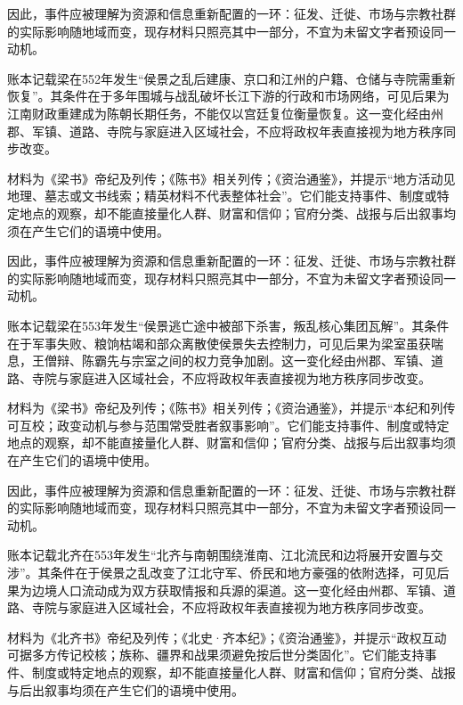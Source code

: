 因此，事件应被理解为资源和信息重新配置的一环：征发、迁徙、市场与宗教社群的实际影响随地域而变，现存材料只照亮其中一部分，不宜为未留文字者预设同一动机。

账本记载梁在552年发生“侯景之乱后建康、京口和江州的户籍、仓储与寺院需重新恢复”。其条件在于多年围城与战乱破坏长江下游的行政和市场网络，可见后果为江南财政重建成为陈朝长期任务，不能仅以宫廷复位衡量恢复。这一变化经由州郡、军镇、道路、寺院与家庭进入区域社会，不应将政权年表直接视为地方秩序同步改变。

材料为《梁书》帝纪及列传；《陈书》相关列传；《资治通鉴》，并提示“地方活动见地理、墓志或文书线索；精英材料不代表整体社会”。它们能支持事件、制度或特定地点的观察，却不能直接量化人群、财富和信仰；官府分类、战报与后出叙事均须在产生它们的语境中使用。

因此，事件应被理解为资源和信息重新配置的一环：征发、迁徙、市场与宗教社群的实际影响随地域而变，现存材料只照亮其中一部分，不宜为未留文字者预设同一动机。

账本记载梁在553年发生“侯景逃亡途中被部下杀害，叛乱核心集团瓦解”。其条件在于军事失败、粮饷枯竭和部众离散使侯景失去控制力，可见后果为梁室虽获喘息，王僧辩、陈霸先与宗室之间的权力竞争加剧。这一变化经由州郡、军镇、道路、寺院与家庭进入区域社会，不应将政权年表直接视为地方秩序同步改变。

材料为《梁书》帝纪及列传；《陈书》相关列传；《资治通鉴》，并提示“本纪和列传可互校；政变动机与参与范围常受胜者叙事影响”。它们能支持事件、制度或特定地点的观察，却不能直接量化人群、财富和信仰；官府分类、战报与后出叙事均须在产生它们的语境中使用。

因此，事件应被理解为资源和信息重新配置的一环：征发、迁徙、市场与宗教社群的实际影响随地域而变，现存材料只照亮其中一部分，不宜为未留文字者预设同一动机。

账本记载北齐在553年发生“北齐与南朝围绕淮南、江北流民和边将展开安置与交涉”。其条件在于侯景之乱改变了江北守军、侨民和地方豪强的依附选择，可见后果为边境人口流动成为双方获取情报和兵源的渠道。这一变化经由州郡、军镇、道路、寺院与家庭进入区域社会，不应将政权年表直接视为地方秩序同步改变。

材料为《北齐书》帝纪及列传；《北史·齐本纪》；《资治通鉴》，并提示“政权互动可据多方传记校核；族称、疆界和战果须避免按后世分类固化”。它们能支持事件、制度或特定地点的观察，却不能直接量化人群、财富和信仰；官府分类、战报与后出叙事均须在产生它们的语境中使用。


